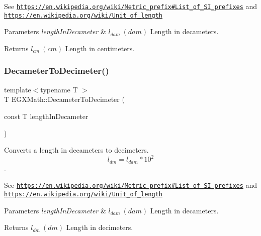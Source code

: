 See \href{https://en.wikipedia.org/wiki/Metric_prefix#List_of_SI_prefixes}{\tt https\+://en.\+wikipedia.\+org/wiki/\+Metric\+\_\+prefix\#\+List\+\_\+of\+\_\+\+S\+I\+\_\+prefixes} and \href{https://en.wikipedia.org/wiki/Unit_of_length}{\tt https\+://en.\+wikipedia.\+org/wiki/\+Unit\+\_\+of\+\_\+length} 
\begin{DoxyParams}{Parameters}
{\em length\+In\+Decameter} & $ l_{dam}\ (dam)$ Length in decameters. \\
\hline
\end{DoxyParams}
\begin{DoxyReturn}{Returns}
$ l_{cm}\ (cm)$ Length in centimeters. 
\end{DoxyReturn}
\mbox{\label{group___e_g_x_math-_conversions-_length_conversions-_decameter-_s_i_gac3c82c1b67121be9717c2619bc26242b}} 
\subsubsection{\texorpdfstring{Decameter\+To\+Decimeter()}{DecameterToDecimeter()}}
{\footnotesize\ttfamily template$<$typename T $>$ \\
T E\+G\+X\+Math\+::\+Decameter\+To\+Decimeter (\begin{DoxyParamCaption}\item[{const T}]{length\+In\+Decameter }\end{DoxyParamCaption})}



Converts a length in decameters to decimeters. \[ l_{dm}=l_{dam} * 10^{2} \]. 

See \href{https://en.wikipedia.org/wiki/Metric_prefix#List_of_SI_prefixes}{\tt https\+://en.\+wikipedia.\+org/wiki/\+Metric\+\_\+prefix\#\+List\+\_\+of\+\_\+\+S\+I\+\_\+prefixes} and \href{https://en.wikipedia.org/wiki/Unit_of_length}{\tt https\+://en.\+wikipedia.\+org/wiki/\+Unit\+\_\+of\+\_\+length} 
\begin{DoxyParams}{Parameters}
{\em length\+In\+Decameter} & $ l_{dam}\ (dam)$ Length in decameters. \\
\hline
\end{DoxyParams}
\begin{DoxyReturn}{Returns}
$ l_{dm}\ (dm)$ Length in decimeters. 
\end{DoxyReturn}
\mbox{\label{group___e_g_x_math-_conversions-_length_conversions-_decameter-_s_i_ga66b4bffe5923acdb3c8a249d81be196f}} 
